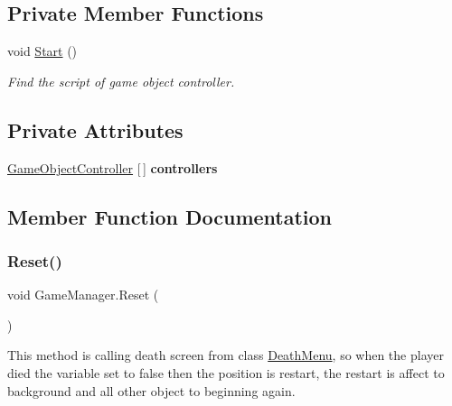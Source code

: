 \subsection*{Private Member Functions}
\begin{DoxyCompactItemize}
\item 
void \hyperlink{class_game_manager_a5ccfacd027ad08eeb4ff1f25a7f59c98}{Start} ()
\begin{DoxyCompactList}\small\item\em Find the script of game object controller. \end{DoxyCompactList}\end{DoxyCompactItemize}
\subsection*{Private Attributes}
\begin{DoxyCompactItemize}
\item 
\hypertarget{class_game_manager_ad64a4296e968a9e69b31f72f23e87235}{}\label{class_game_manager_ad64a4296e968a9e69b31f72f23e87235} 
\hyperlink{class_game_object_controller}{Game\+Object\+Controller} \mbox{[}$\,$\mbox{]} {\bfseries controllers}
\end{DoxyCompactItemize}


\subsection{Member Function Documentation}
\hypertarget{class_game_manager_a50401d6452934e7e126cd24bd5e04e79}{}\label{class_game_manager_a50401d6452934e7e126cd24bd5e04e79} 
\subsubsection{\texorpdfstring{Reset()}{Reset()}}
{\footnotesize\ttfamily void Game\+Manager.\+Reset (\begin{DoxyParamCaption}{ }\end{DoxyParamCaption})}



This method is calling death screen from class \hyperlink{class_death_menu}{Death\+Menu}, so when the player died the variable set to false then the position is restart, the restart is affect to background and all other object to beginning again. 

\hypertarget{class_game_manager_acad1293048a68e6ba14c1a62c7503c09}{}\label{class_game_manager_acad1293048a68e6ba14c1a62c7503c09} 
